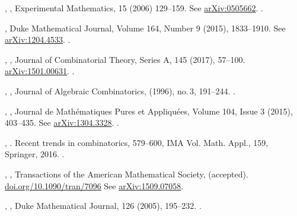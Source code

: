 \documentclass[12pt]{amsart}
\theoremstyle{plain}
\theoremstyle{definition}
\theoremstyle{remark}
\begin{document}
\begin{thebibliography}{10}
,
,
Experimental Mathematics, 15 (2006) 129--159.
See \href{https://arxiv.org/abs/math/0505662}{arXiv:0505662}. .

,
Duke Mathematical Journal, 
Volume 164, Number 9 (2015), 1833--1910.
See \href{https://arxiv.org/pdf/1204.4533.pdf}{arXiv:1204.4533}. .

,
,
Journal of Combinatorial Theory, Series A, 145 (2017), 57--100.
\href{https://arxiv.org/pdf/1501.00631.pdf}{arXiv:1501.00631}. .

  ,
 , 
 Journal of Algebraic Combinatorics,  (1996), no.\,3, 191--244. .

,
,
Journal de Math\'ematiques Pures et Appliqu\'ees,
Volume 104, Issue 3 (2015),  403--435.
See \href{http://arxiv.org/abs/1304.3328}{arXiv:1304.3328}.  .

,
. 
Recent trends in combinatorics, 579--600, IMA Vol. Math. Appl., 159, Springer, 2016. .


, 
,  
Transactions of the American Mathe\-matical Society, (accepted).
\href{https://doi.org/10.1090/tran/7096}{doi.org/10.1090/tran/7096} 
See \href{http://arxiv.org/abs/1509.07058}{arXiv:1509.07058}.

,
,
Duke Mathematical Journal,  126 (2005), 195--232. .



\end{thebibliography}
\end{document}
